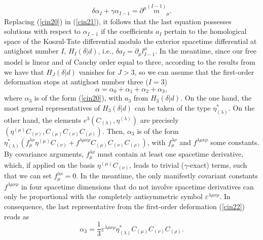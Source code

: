 \documentclass[a4paper,12pt]{article}
\begin{document}
\begin{equation}
\delta \alpha _{I}+\gamma \alpha _{I-1}=\partial ^{\mu }\stackrel{(I-1)}{m}%
_{\mu }.  \label{cin21}
\end{equation}
Replacing (\ref{cin20}) in (\ref{cin21}), it follows that the last equation
possesses solutions with respect to $\alpha _{I-1}$ if the coefficients $%
a_{I}$ pertain to the homological space of the Koszul-Tate differential
modulo the exterior spacetime differential at antighost number $I$, $%
H_{I}\left( \delta |d\right) $, i.e., $\delta a_{I}=\partial _{\mu
}l_{I-1}^{\mu }$. In the meantime, since our free model is linear
and of Cauchy order equal to three, according to the results from
\cite{gen1} we have that $H_{J}\left( \delta |d\right) $ vanishes
for $J>3$, so we can assume that the first-order deformation stops
at antighost number three ($I=3$)
\begin{equation}
\alpha =\alpha _{0}+\alpha _{1}+\alpha _{2}+\alpha _{3},  \label{cin22}
\end{equation}
where $\alpha _{3}$ is of the form (\ref{cin20}), with $a_{3}$ from $%
H_{3}\left( \delta |d\right) $. On the one hand, the most general
representatives of $H_{3}(\delta |d)$ can be taken of the type
$\eta _{(\lambda )}^{*}$. On the other hand, the elements
$e^{3}\left( C_{(\lambda )},\eta ^{(\lambda )}\right) $ are
precisely $\left( \eta ^{(\mu )}C_{(\nu )},C_{(\mu )}C_{(\nu
)}C_{(\rho )}\right) $. Then, $\alpha _{3}$ is of the form $\eta
_{(\lambda )}^{*}\left( f_{\mu }^{\lambda \nu }\eta ^{(\mu
)}C_{(\nu )}+f^{\lambda \mu \nu \rho }C_{(\mu )}C_{(\nu )}C_{(\rho
)}\right) $, with $f_{\mu }^{\lambda \nu }$ and $f^{\lambda \mu
\nu \rho }$ some constants. By covariance arguments, $f_{\mu
}^{\lambda \nu }$ must contain at least one spacetime derivative,
which, if applied on the basis $\eta ^{(\mu )}C_{(\nu )}$, leads
to trivial ($\gamma $-exact) terms, such that we can set $f_{\mu
}^{\lambda \nu }=0$. In the meantime, the only manifestly
covariant constants $f^{\lambda \mu \nu \rho }$ in four spacetime
dimensions that do not involve spacetime derivatives can only be
proportional with the completely antisymmetric symbol $\varepsilon
^{\lambda \mu \nu \rho }$. In consequence, the last representative
from the first-order deformation (\ref {cin22}) reads as
\begin{equation}
\alpha _{3}=\frac{1}{3}\varepsilon ^{\lambda \mu \nu \rho }\eta _{(\lambda
)}^{*}C_{(\mu )}C_{(\nu )}C_{(\rho )}.  \label{cin25}
\end{equation}
\end{document}
